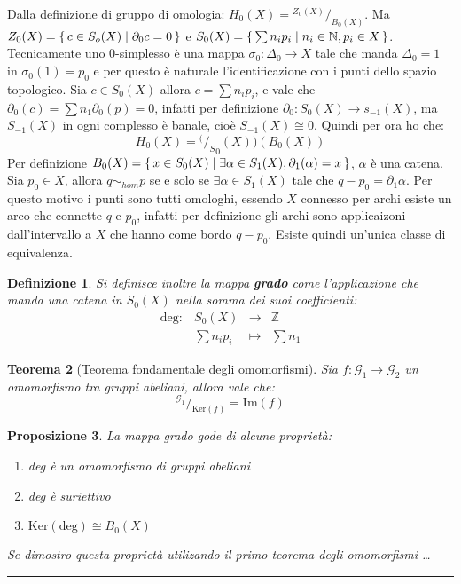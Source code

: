 \documentclass[10pt, twoside=false, x11names]{scrbook}
\newtheorem{theorem}{Teorema}[section]
\newtheorem{proposition}[theorem]{Proposizione}
\newtheorem{definition}[theorem]{Definizione}
\newenvironment{proof}{{\textbf{Dimostrazione}:}}{\hfill\rule{2mm}{2mm} \newline}
\newcommand{\Z}{\mathbb{Z}}
\newcommand{\im}[1]{\mathrm{Im}( #1 )}
\renewcommand{\ker}[1]{\mathrm{Ker}( #1)}
\newcommand*\quot[2]{{^{\textstyle #1}\big/_{\textstyle #2}}}
\begin{document}
\begin{proof}
  Dalla definizione di gruppo di omologia: $ H_0(X) = \quot{Z_0(X)}{B_0(X)} $.
  Ma $ Z_0(X) = \set{ c \in S_o(X) | \partial_0 c = 0} $ e $ S_0(X) = \set{ \sum n_i p_i | n_i \in \mathbb{N}, p_i \in X} $.
  Tecnicamente uno $ 0 $-simplesso è una mappa $ \sigma_0 : \Delta_0 \to X $ tale che manda $ \Delta_0 = 1 $ in $ \sigma_0(1) = p_0 $ e per
  questo è naturale l'identificazione con i punti dello spazio topologico.
  Sia $ c \in S_0(X) $ allora $ c = \sum n_i p_i $, e vale che $ \partial_0(c) = \sum n_1 \partial_0 (p) = 0 $, infatti per definizione
  $ \partial_0 : S_0(X) \to s_{-1}(X) $, ma $ S_{-1}(X) $ in ogni complesso è banale, cioè $ S_{-1}(X) \cong 0 $.
  Quindi per ora ho che:
  \[
    H_0(X) = \quot(S_0(X))(B_0(X))
  \]
  Per definizione $ B_0(X) = \set{ x \in S_0(X) | \exists \alpha \in S_1(X), \partial_1(\alpha) = x} $, $ \alpha $ è una catena. Sia $ p_0 \in X $, allora
  $ q \sim_{hom} p $ se e solo se $ \exists \alpha \in S_1(X) $ tale che $ q - p_0 = \partial_1 \alpha $. Per questo motivo i punti sono tutti omologhi,
  essendo $ X $ connesso per archi esiste un arco che connette $ q $ e $ p_0 $, infatti per definizione gli archi sono applicaizoni
  dall'intervallo a $ X $ che hanno come bordo $ q - p_0 $. Esiste quindi un'unica classe di equivalenza.

  \begin{definition}
    Si definisce inoltre la mappa \textbf{grado}  come l'applicazione che manda una catena in $ S_0(X) $ nella somma
    dei suoi coefficienti:
    \begin{align*}
      \mathrm{deg}: & S_0(X)    & \to & \Z \\
                    & \sum n_i p_i & \mapsto & \sum n_1
    \end{align*}
  \end{definition}

  \begin{theorem}[Teorema fondamentale degli omomorfismi]
    Sia $ f: \mathcal{G}_1 \to \mathcal{G}_2 $ un omomorfismo tra gruppi abeliani, allora vale che:
    \[
      \quot{\mathcal{G}_1}{\ker{f}} = \im{f}
    \]
  \end{theorem}

  \begin{proposition}
    La mappa grado gode di alcune proprietà:
    \begin{enumerate}
    \item deg è un omomorfismo di gruppi abeliani
    \item deg è suriettivo
    \item $ \ker{\mathrm{deg}} \cong B_0(X) $
    \end{enumerate}
    Se dimostro questa proprietà utilizando il primo teorema degli omomorfismi \dots


\end{proposition}
\end{proof}
\end{document}

